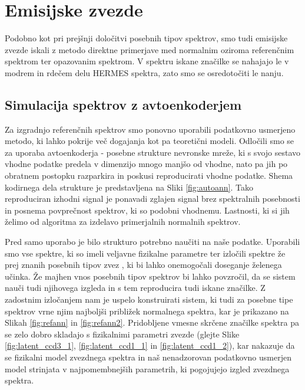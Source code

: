 \section{Emisijske zvezde}
\label{sec:slo_emisijske}
Podobno kot pri prejšnji določitvi posebnih tipov spektrov, smo tudi emisijske zvezde iskali z metodo direktne primerjave med normalnim oziroma referenčnim spektrom ter opazovanim spektrom. V spektru iskane značilke se nahajajo le v modrem in rdečem delu HERMES spektra, zato smo se osredotočiti le nanju.

\subsection{Simulacija spektrov z avtoenkoderjem}
Za izgradnjo referenčnih spektrov smo ponovno uporabili podatkovno usmerjeno metodo, ki lahko pokrije več dogajanja kot pa teoretični modeli. Odločili smo se za uporaba avtoenkoderja - posebne strukture nevronske mreže, ki s svojo sestavo vhodne podatke predela v dimenzijo mnogo manjšo od vhodne, nato pa jih po obratnem postopku razparkira in poskusi reproducirati vhodne podatke. Shema kodirnega dela strukture je predstavljena na Sliki \ref{fig:autoann}. Tako reproduciran izhodni signal je ponavadi zglajen signal brez spektralnih posebnosti in posnema povprečnost spektrov, ki so podobni vhodnemu. Lastnosti, ki si jih želimo od algoritma za izdelavo primerjalnih normalnih spektrov. 

Pred samo uporabo je bilo strukturo potrebno naučiti na naše podatke. Uporabili smo vse spektre, ki so imeli veljavne fizikalne parametre ter izločili spektre že prej znanih posebnih tipov zvez \cite{2017ApJS..228...24T}, ki bi lahko onemogočali doseganje želenega učinka. Že majhen vnos posebnih tipov spektrov bi lahko povzročil, da se sistem nauči tudi njihovega izgleda in s tem reproducira tudi iskane značilke. Z zadostnim izločanjem nam je uspelo konstruirati sistem, ki tudi za posebne tipe spektrov vrne njim najboljši približek normalnega spektra, kar je prikazano na Slikah \ref{fig:refann} in \ref{fig:refann2}. Pridobljene vmesne skrčene značilke spektra pa se zelo dobro skladajo s fizikalnimi parametri zvezde (glejte Slike \ref{fig:latent_ccd3_1}, \ref{fig:latent_ccd1_1} in \ref{fig:latent_ccd1_2}), kar nakazuje da se fizikalni model zvezdnega spektra in naš nenadzorovan podatkovno usmerjen model strinjata v najpomembnejših parametrih, ki pogojujejo izgled zvezdnega spektra.

